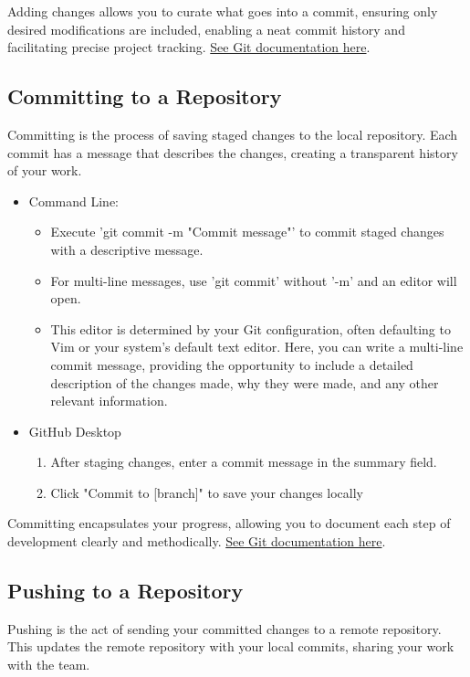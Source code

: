 \documentclass[10pt,twocolumn]{article}
\begin{document}
Adding changes allows you to curate what goes into a commit, ensuring only desired modifications are included, enabling a neat commit history and facilitating precise project tracking. \hyperlink{https://git-scm.com/docs/git-add}{See Git documentation here}. \cite{GitAddDocumentation}\cite{GitGuidesAdd}

\subsection{Committing to a Repository}
Committing is the process of saving staged changes to the local repository. Each commit has a message that describes the changes, creating a transparent history of your work.


\begin{itemize}
    \item Command Line: 
    \begin{itemize}
        \item  Execute 'git commit -m "Commit message"' to commit staged changes with a descriptive message.
        \item For multi-line messages, use 'git commit' without '-m' and an editor will open. 
        \item This editor is determined by your Git configuration, often defaulting to Vim or your system's default text editor. Here, you can write a multi-line commit message, providing the opportunity to include a detailed description of the changes made, why they were made, and any other relevant information.
    \end{itemize}
    \item GitHub Desktop
    \begin{enumerate}
        \item After staging changes, enter a commit message in the summary field.
        \item Click "Commit to [branch]" to save your changes locally
    \end{enumerate}
    
\end{itemize}

Committing encapsulates your progress, allowing you to document each step of development clearly and methodically. \hyperlink{https://git-scm.com/docs/git-commit}{See Git documentation here}. \cite{GitCommitDocumentation}\cite{GitGuidesCommit}

\subsection{Pushing to a Repository}
Pushing is the act of sending your committed changes to a remote repository. This updates the remote repository with your local commits, sharing your work with the team.
\end{document}
